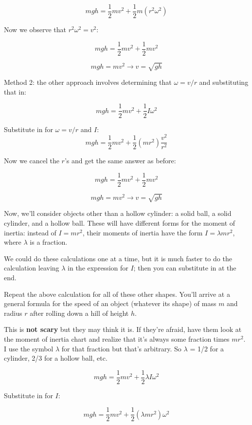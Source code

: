 \documentclass[12pt]{article}
\begin{document}
\begin{enumerate}
{{\begin{enumerate}
{    	$$mgh = \frac{1}{2}mv^2 + \frac{1}{2} m\left(r^2 \omega ^2\right)$$
    	
    	Now we observe that $r^2 \omega^2 = v^2$:
    	
    	$$mgh = \frac{1}{2}mv^2 + \frac{1}{2} mv^2$$
    	
    	$$mgh = mv^2 \rightarrow v = \sqrt{gh}$$
    	
    	Method 2: the other approach involves determining that $\omega = v/r$ and substituting that in:
    	
    	$$mgh = \frac{1}{2}mv^2 + \frac{1}{2}I \omega ^2$$
    	
    	Substitute in for $\omega = v/r$ and $I$:  	
    	$$mgh = \frac{1}{2}mv^2 + \frac{1}{2} \left(mr^2\right) \frac{v^2}{r^2}$$
    	
    	Now we cancel the $r$'s and get the same answer as before:
      	
    	$$mgh = \frac{1}{2}mv^2 + \frac{1}{2} mv^2$$
    	
    	$$mgh = mv^2 \rightarrow v = \sqrt{gh}$$
    	
    }

    Now, we'll consider objects other than a hollow cylinder: a solid ball, a solid cylinder, and a hollow ball. These will have different forms for the moment of inertia: instead of $I=mr^2$, their moments of inertia have the form $I=\lambda mr^2$, where $\lambda$ is a fraction. 
    
    We could do these calculations one at a time, but it is much faster to do the calculation leaving $\lambda$ in the expression for $I$; then you can substitute in at the end.
    
    Repeat the above calculation for all of these other shapes. You'll arrive at a general formula for the speed of an object (whatever its shape) of mass $m$ and radius $r$ after rolling down a hill of height $h$.
    
      {\color{red}
  	This is {\bf not scary} but they may think it is. If they're afraid, have them look at the moment of inertia chart and realize that it's always some fraction times $mr^2$. I use the symbol $\lambda$ for that fraction but that's arbitrary. So $\lambda$ = 1/2 for a cylinder, 2/3 for a hollow ball, etc.
  }
{  \color{blue}
    	
    $$mgh = \frac{1}{2}mv^2 + \frac{1}{2} \lambda I \omega ^2$$
    
    Substitute in for $I$:
    
    $$mgh = \frac{1}{2}mv^2 + \frac{1}{2} \left(\lambda mr^2\right) \omega ^2$$
    
}
\end{enumerate}}}
\end{enumerate}
\end{document}
